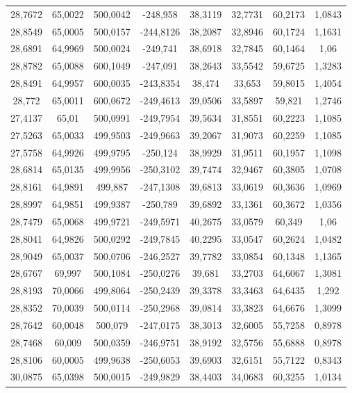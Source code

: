 \begin{longtable}{@{}cccccccc@{}}
28,7672 & 65,0022 & 500,0042 & -248,958 & 38,3119 & 32,7731 & 60,2173 & 1,0843 \\
28,8549 & 65,0005 & 500,0157 & -244,8126 & 38,2087 & 32,8946 & 60,1724 & 1,1631 \\
28,6891 & 64,9969 & 500,0024 & -249,741 & 38,6918 & 32,7845 & 60,1464 & 1,06 \\
28,8782 & 65,0088 & 600,1049 & -247,091 & 38,2643 & 33,5542 & 59,6725 & 1,3283 \\
28,8491 & 64,9957 & 600,0035 & -243,8354 & 38,474 & 33,653 & 59,8015 & 1,4054 \\
28,772 & 65,0011 & 600,0672 & -249,4613 & 39,0506 & 33,5897 & 59,821 & 1,2746 \\
27,4137 & 65,01 & 500,0991 & -249,7954 & 39,5634 & 31,8551 & 60,2223 & 1,1085 \\
27,5263 & 65,0033 & 499,9503 & -249,9663 & 39,2067 & 31,9073 & 60,2259 & 1,1085 \\
27,5758 & 64,9926 & 499,9795 & -250,124 & 38,9929 & 31,9511 & 60,1957 & 1,1098 \\
28,6814 & 65,0135 & 499,9956 & -250,3102 & 39,7474 & 32,9467 & 60,3805 & 1,0708 \\
28,8161 & 64,9891 & 499,887 & -247,1308 & 39,6813 & 33,0619 & 60,3636 & 1,0969 \\
28,8997 & 64,9851 & 499,9387 & -250,789 & 39,6892 & 33,1361 & 60,3672 & 1,0356 \\
28,7479 & 65,0068 & 499,9721 & -249,5971 & 40,2675 & 33,0579 & 60,349 & 1,06 \\
28,8041 & 64,9826 & 500,0292 & -249,7845 & 40,2295 & 33,0547 & 60,2624 & 1,0482 \\
28,9049 & 65,0037 & 500,0706 & -246,2527 & 39,7782 & 33,0854 & 60,1348 & 1,1365 \\
28,6767 & 69,997 & 500,1084 & -250,0276 & 39,681 & 33,2703 & 64,6067 & 1,3081 \\
28,8193 & 70,0066 & 499,8064 & -250,2439 & 39,3378 & 33,3463 & 64,6435 & 1,292 \\
28,8352 & 70,0039 & 500,0114 & -250,2968 & 39,0814 & 33,3823 & 64,6676 & 1,3099 \\
28,7642 & 60,0048 & 500,079 & -247,0175 & 38,3013 & 32,6005 & 55,7258 & 0,8978 \\
28,7468 & 60,009 & 500,0359 & -246,9751 & 38,9192 & 32,5756 & 55,6888 & 0,8978 \\
28,8106 & 60,0005 & 499,9638 & -250,6053 & 39,6903 & 32,6151 & 55,7122 & 0,8343 \\
30,0875 & 65,0398 & 500,0015 & -249,9829 & 38,4403 & 34,0683 & 60,3255 & 1,0134 \\

\end{longtable}
